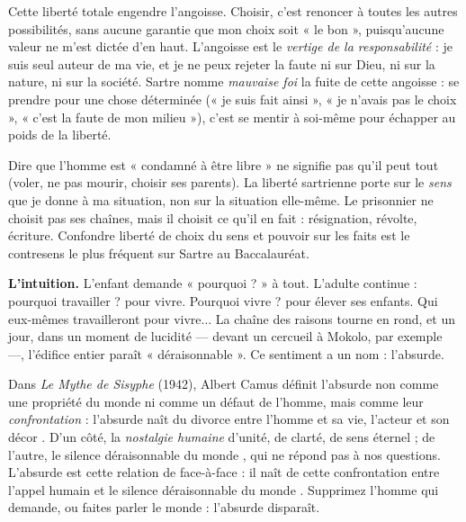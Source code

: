\documentclass[11pt]{article}
\newcommand{\cle}[1]{{\popxbold\color{popdark}#1}}
\newcounter{popsec}
\newcounter{popsub}
\newcommand{\courssub}[1]{%
  \stepcounter{popsub}%
  \par\vspace{9pt}\noindent{\popxbold\fontsize{11.5}{13}\selectfont\color{popink}{\color{poporange}\thepopsec.\thepopsub}\hspace{6pt}#1}\par\nopagebreak\vspace{4pt}
}
\begin{document}
Cette liberté totale engendre l'\cle{angoisse}. Choisir, c'est renoncer à toutes les autres possibilités, sans aucune garantie que mon choix soit « le bon », puisqu'aucune valeur ne m'est dictée d'en haut. L'angoisse est le \emph{vertige de la responsabilité} : je suis seul auteur de ma vie, et je ne peux rejeter la faute ni sur Dieu, ni sur la nature, ni sur la société. Sartre nomme \emph{mauvaise foi} la fuite de cette angoisse : se prendre pour une chose déterminée (« je suis fait ainsi », « je n'avais pas le choix », « c'est la faute de mon milieu »), c'est se mentir à soi-même pour échapper au poids de la liberté.

\begin{attention}
Dire que l'homme est « condamné à être libre » ne signifie pas qu'il peut tout (voler, ne pas mourir, choisir ses parents). La liberté sartrienne porte sur le \emph{sens} que je donne à ma situation, non sur la situation elle-même. Le prisonnier ne choisit pas ses chaînes, mais il choisit ce qu'il en fait : résignation, révolte, écriture. Confondre liberté de choix du sens et pouvoir sur les faits est le contresens le plus fréquent sur Sartre au Baccalauréat.
\end{attention}

\courssub{L'absurde : Camus et le silence du monde}

\textbf{L'intuition.} L'enfant demande « pourquoi ? » à tout. L'adulte continue : pourquoi travailler ? pour vivre. Pourquoi vivre ? pour élever ses enfants. Qui eux-mêmes travailleront pour vivre... La chaîne des raisons tourne en rond, et un jour, dans un moment de lucidité — devant un cercueil à Mokolo, par exemple —, l'édifice entier paraît « déraisonnable ». Ce sentiment a un nom : l'\cle{absurde}.

\begin{definition}
Dans \emph{Le Mythe de Sisyphe} (1942), Albert Camus définit l'absurde non comme une propriété du monde ni comme un défaut de l'homme, mais comme leur \emph{confrontation} : l'absurde naît du \guillemotleft divorce entre l'homme et sa vie, l'acteur et son décor \guillemotright. D'un côté, la \emph{nostalgie humaine} d'unité, de clarté, de sens éternel ; de l'autre, le \guillemotleft silence déraisonnable du monde \guillemotright, qui ne répond pas à nos questions. L'absurde est cette relation de face-à-face : il \guillemotleft naît de cette confrontation entre l'appel humain et le silence déraisonnable du monde \guillemotright. Supprimez l'homme qui demande, ou faites parler le monde : l'absurde disparaît.
\end{definition}
\end{document}

